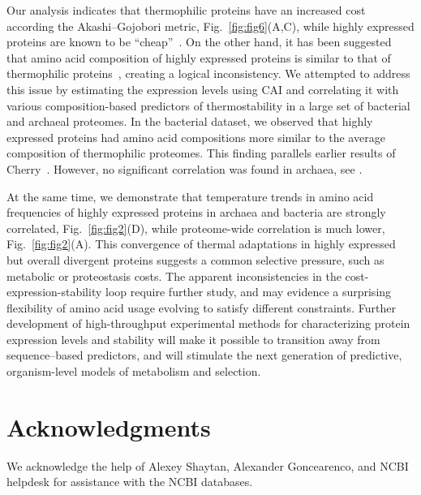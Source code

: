 \documentclass[10pt,letterpaper]{article}
\begin{document}
Our analysis indicates that thermophilic proteins have an increased cost according the Akashi--Gojobori metric, Fig.~\ref{fig:fig6}(A,C), while highly expressed proteins are known to be ``cheap''~\cite{Akashi2002Metabolic}. On the other hand, it has been suggested that amino acid composition of highly expressed proteins is similar to that of thermophilic proteins~\cite{Cherry2010Highly}, creating a logical inconsistency. We attempted to address this issue by estimating the expression levels using CAI and correlating it with various composition-based predictors of thermostability in a large set of bacterial and archaeal proteomes. In the bacterial dataset, we observed that highly expressed proteins had amino acid compositions more similar to the average composition of thermophilic proteomes. This finding parallels earlier results of Cherry~\cite{Cherry2010Highly}. However, no significant correlation was found in archaea, see . 

At the same time, we demonstrate that temperature trends in amino acid frequencies of highly expressed proteins in archaea and bacteria are strongly correlated, Fig.~\ref{fig:fig2}(D), while proteome-wide correlation is much lower, Fig.~\ref{fig:fig2}(A). This convergence of thermal adaptations in highly expressed but overall divergent proteins suggests a common selective pressure, such as metabolic or proteostasis costs. The apparent inconsistencies in the cost-expression-stability loop require further study, and may evidence a surprising flexibility of amino acid usage evolving to satisfy different constraints. Further development of high-throughput experimental methods for characterizing protein expression levels and stability will make it possible to transition away from sequence--based predictors, and will stimulate the next generation of predictive, organism-level models of metabolism and selection.





\section*{Acknowledgments}

We acknowledge the help of Alexey Shaytan, Alexander Goncearenco, and NCBI helpdesk for assistance with the NCBI databases.
\end{document}
